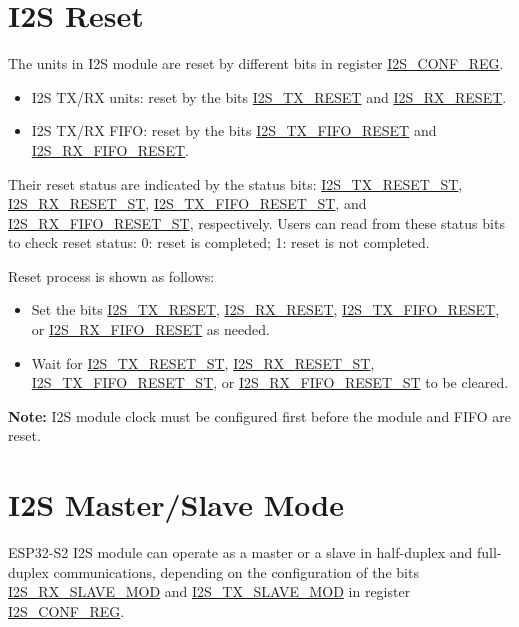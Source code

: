 \documentclass[main\_\_EN.tex]{subfiles}
\begin{document}
\section{I2S Reset} \label{module_reset}

The units in I2S module are reset by different bits in register \hyperref[regdesc:I2SCONFREG]{I2S\_CONF\_REG}.

\begin{itemize}
    \item I2S TX/RX units: reset by the bits \hyperref[fielddesc:I2STXRESET]{I2S\_TX\_RESET} and \hyperref[fielddesc:I2SRXRESET]{I2S\_RX\_RESET}.
    \item I2S TX/RX FIFO: reset by the bits \hyperref[fielddesc:I2STXFIFORESET]{I2S\_TX\_FIFO\_RESET} and \hyperref[fielddesc:I2SRXFIFORESET]{I2S\_RX\_FIFO\_RESET}.
\end{itemize}

Their reset status are indicated by the status bits: \hyperref[fielddesc:I2STXRESETST]{I2S\_TX\_RESET\_ST}, \hyperref[fielddesc:I2SRXRESETST]{I2S\_RX\_RESET\_ST}, \hyperref[fielddesc:I2STXFIFORESETST]{I2S\_TX\_FIFO\_RESET\_ST}, and \hyperref[fielddesc:I2SRXFIFORESETST]{I2S\_RX\_FIFO\_RESET\_ST}, respectively. Users can read from these status bits to check reset status: 0: reset is completed; 1: reset is not completed.

Reset process is shown as follows:
\begin{itemize}
    \item Set the bits \hyperref[fielddesc:I2STXRESET]{I2S\_TX\_RESET}, \hyperref[fielddesc:I2SRXRESET]{I2S\_RX\_RESET}, \hyperref[fielddesc:I2STXFIFORESET]{I2S\_TX\_FIFO\_RESET}, or \hyperref[fielddesc:I2SRXFIFORESET]{I2S\_RX\_FIFO\_RESET} as needed.
    \item Wait for \hyperref[fielddesc:I2STXRESETST]{I2S\_TX\_RESET\_ST}, \hyperref[fielddesc:I2SRXRESETST]{I2S\_RX\_RESET\_ST}, \hyperref[fielddesc:I2STXFIFORESETST]{I2S\_TX\_FIFO\_RESET\_ST}, or \hyperref[fielddesc:I2SRXFIFORESETST]{I2S\_RX\_FIFO\_RESET\_ST} to be cleared.
\end{itemize}

{\bfseries Note: }
I2S module clock must be configured first before the module and FIFO are reset.

\section{I2S Master/Slave Mode}

ESP32-S2 I2S module can operate as a master or a slave in half-duplex and full-duplex communications, depending on the configuration of the bits \hyperref[fielddesc:I2SRXSLAVEMOD]{I2S\_RX\_SLAVE\_MOD} and \hyperref[fielddesc:I2STXSLAVEMOD]{I2S\_TX\_SLAVE\_MOD} in register \hyperref[regdesc:I2SCONFREG]{I2S\_CONF\_REG}.
\end{document}
